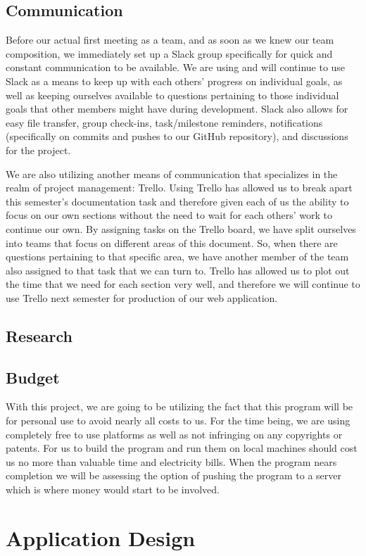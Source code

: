 \documentclass[12pt,a4paper]{report}
\begin{document}
	\section{Communication}
	Before our actual first meeting as a team, and as soon as we knew our team composition, we immediately set up a Slack group specifically for quick and constant communication to be available. We are using and will continue to use Slack as a means to keep up with each others' progress on individual goals, as well as keeping ourselves available to questions pertaining to those individual goals that other members might have during development. Slack also allows for easy file transfer, group check-ins, task/milestone reminders, notifications (specifically on commits and pushes to our GitHub repository), and discussions for the project. \par
	We are also utilizing another means of communication that specializes in the realm of project management: Trello. Using Trello has allowed us to break apart this semester's documentation task and therefore given each of us the ability to focus on our own sections without the need to wait for each others' work to continue our own. By assigning tasks on the Trello board, we have split ourselves into teams that focus on different areas of this document. So, when there are questions pertaining to that specific area, we have another member of the team also assigned to that task that we can turn to. Trello has allowed us to plot out the time that we need for each section very well, and therefore we will continue to use Trello next semester for production of our web application.
	\section{Research}
	\section{Budget}
	With this project, we are going to be utilizing the fact that this program will be for personal use to avoid nearly all costs to us. For the time being, we are using completely free to use platforms as well as not infringing on any copyrights or patents. For us to build the program and run them on local machines should cost us no more than valuable time and electricity bills. When the program nears completion we will be assessing the option of pushing the program to a server which is where money would start to be involved.
	
\newpage
\chapter*{Application Design}
\end{document}
